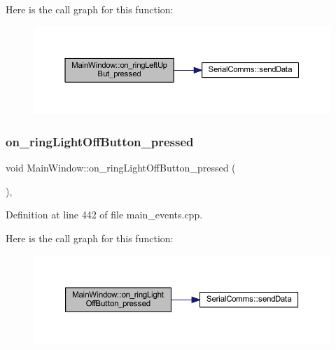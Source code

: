 Here is the call graph for this function\+:
\nopagebreak
\begin{figure}[H]
\begin{center}
\leavevmode
\includegraphics[width=350pt]{classMainWindow_aefd08ff26ec69cb1a8c2da298e414742_cgraph}
\end{center}
\end{figure}
\mbox{\label{classMainWindow_ac5c8ca012c0b479ca3b42a172df11f99}} 
\subsubsection{\texorpdfstring{on\_ringLightOffButton\_pressed}{on\_ringLightOffButton\_pressed}}
{\footnotesize\ttfamily void Main\+Window\+::on\+\_\+ring\+Light\+Off\+Button\+\_\+pressed (\begin{DoxyParamCaption}{ }\end{DoxyParamCaption})\hspace{0.3cm}{\ttfamily [private]}, {\ttfamily [slot]}}



Definition at line 442 of file main\+\_\+events.\+cpp.

Here is the call graph for this function\+:
\nopagebreak
\begin{figure}[H]
\begin{center}
\leavevmode
\includegraphics[width=350pt]{classMainWindow_ac5c8ca012c0b479ca3b42a172df11f99_cgraph}
\end{center}
\end{figure}
\mbox{\label{classMainWindow_ac7c8a9d8f85ea41b9017fb13c95c3e79}} 
